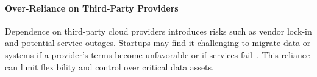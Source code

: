 \documentclass{article}
\begin{document}
\paragraph{Over-Reliance on Third-Party Providers}
Dependence on third-party cloud providers introduces risks such as vendor lock-in and potential service outages. Startups may find it challenging to migrate data or systems if a provider's terms become unfavorable or if services fail~\cite{cloudflare_vendor_lockin}. This reliance can limit flexibility and control over critical data assets.







\end{document}
